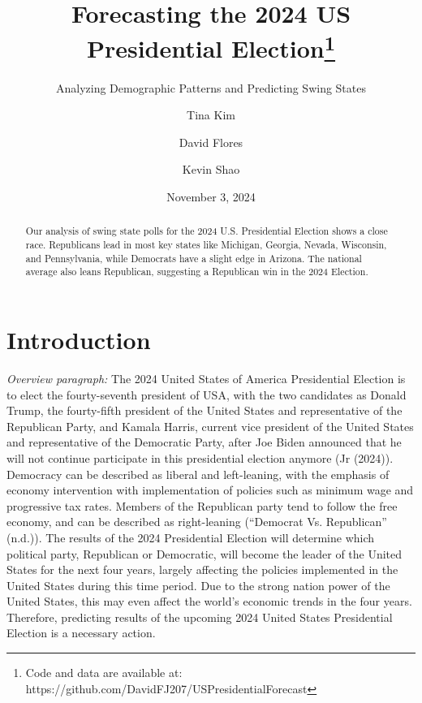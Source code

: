 \documentclass[
  letterpaper,
  DIV=11,
  numbers=noendperiod]{scrartcl}
\title{Forecasting the 2024 US Presidential Election\thanks{Code and
data are available at:
https://github.com/DavidFJ207/USPresidentialForecast}}
\subtitle{Analyzing Demographic Patterns and Predicting Swing States}
\author{Tina Kim \and David Flores \and Kevin Shao}
\date{November 3, 2024}
\begin{document}
\maketitle
\begin{abstract}
Our analysis of swing state polls for the 2024 U.S. Presidential
Election shows a close race. Republicans lead in most key states like
Michigan, Georgia, Nevada, Wisconsin, and Pennsylvania, while Democrats
have a slight edge in Arizona. The national average also leans
Republican, suggesting a Republican win in the 2024 Election.
\end{abstract}


\section{Introduction}\label{introduction}

\emph{Overview paragraph:} The 2024 United States of America
Presidential Election is to elect the fourty-seventh president of USA,
with the two candidates as Donald Trump, the fourty-fifth president of
the United States and representative of the Republican Party, and Kamala
Harris, current vice president of the United States and representative
of the Democratic Party, after Joe Biden announced that he will not
continue participate in this presidential election anymore (Jr (2024)).
Democracy can be described as liberal and left-leaning, with the
emphasis of economy intervention with implementation of policies such as
minimum wage and progressive tax rates. Members of the Republican party
tend to follow the free economy, and can be described as right-leaning
({``Democrat Vs. Republican''} (n.d.)). The results of the 2024
Presidential Election will determine which political party, Republican
or Democratic, will become the leader of the United States for the next
four years, largely affecting the policies implemented in the United
States during this time period. Due to the strong nation power of the
United States, this may even affect the world's economic trends in the
four years. Therefore, predicting results of the upcoming 2024 United
States Presidential Election is a necessary action.
\end{document}
